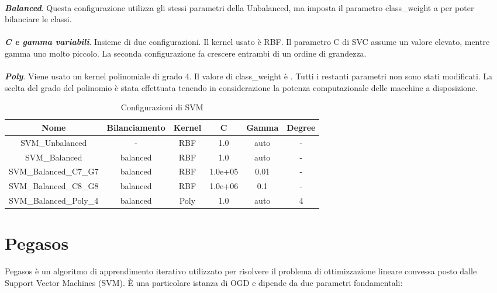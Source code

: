 \documentclass[12pt,a4paper,oneside,hidelinks]{report}
\begin{document}
\paragraph*{}
\textbf{\textit{Balanced}}. Questa configurazione utilizza gli stessi parametri della Unbalanced, ma imposta il parametro class\_weight a  per poter bilanciare le classi.

\paragraph*{}
\textbf{\textit{C e gamma variabili}}. Insieme di due configurazioni. Il kernel usato è RBF. Il parametro C di SVC assume un valore elevato, mentre gamma uno molto piccolo. La seconda configurazione fa crescere entrambi di un ordine di grandezza.

\paragraph*{}
\textbf{\textit{Poly}}. Viene usato un kernel polinomiale di grado 4. Il valore di class\_weight è . Tutti i restanti parametri non sono stati modificati. La scelta del grado del polinomio è stata effettuata tenendo in considerazione la potenza computazionale delle macchine a disposizione.

\begin{table}[ht]%
\centering
\caption{Configurazioni di SVM}\label{tab:b2}
\begin{tabular}{|c|c|c|S[table-parse-only = true]|S[table-parse-only = true]|c|}
\hline
Nome                    & Bilanciamento & Kernel & C        & Gamma & Degree    \\ 
\hline 
SVM\_Unbalanced         & -             & RBF    & 1.0      & auto    & -       \\
\hline 
SVM\_Balanced           & balanced      & RBF    & 1.0      & auto    & -       \\
\hline 
SVM\_Balanced\_C7\_G7   & balanced      & RBF    & 1.0e+05  & 0.01    & -       \\
\hline 
SVM\_Balanced\_C8\_G8   & balanced      & RBF    & 1.0e+06  & 0.1     & -       \\
\hline 
SVM\_Balanced\_Poly\_4  & balanced      & Poly   & 1.0      & auto    & 4       \\
\hline 
\end{tabular} 
\end{table}

\section{Pegasos}
Pegasos è un algoritmo di apprendimento iterativo utilizzato per risolvere il problema di ottimizzazione lineare convessa posto dalle Support Vector Machines (SVM).
È una particolare istanza di OGD e dipende da due parametri fondamentali:
\end{document}
